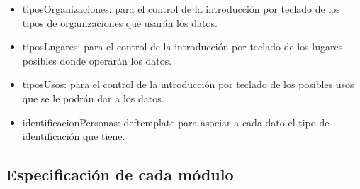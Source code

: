 \begin{itemize}
\begin{itemize}
			\item tiposOrganizaciones: para el control de la introducción por teclado de los tipos de organizaciones que usarán los datos.
			\item tiposLugares:  para el control de la introducción por teclado de los lugares posibles donde operarán los datos.
			\item tiposUsos:  para el control de la introducción por teclado de los posibles usos que se le podrán dar a los datos.
			\item identificacionPersonas: deftemplate para asociar a cada dato el tipo de identificación que tiene.
		\end{itemize}
\end{itemize}

\subsection{Especificación de cada módulo}
	
